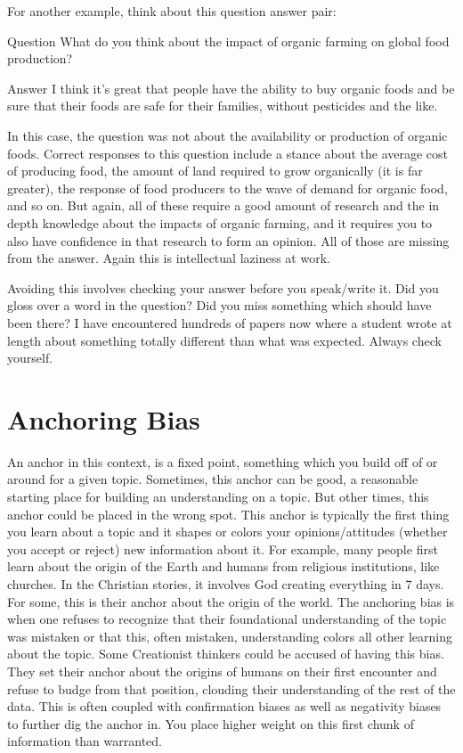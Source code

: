 For another example, think about this question answer pair:
\begin{earg}
\item[Question] What do you think about the impact of organic farming on global food production?
\item[Answer] I think it's great that people have the ability to buy organic foods and be sure that their foods are safe for their families, without pesticides and the like.
\end{earg}
In this case, the question was not about the availability or production of organic foods. Correct responses to this question include a stance about the average cost of producing food, the amount of land required to grow organically (it is far greater), the response of food producers to the wave of demand for organic food, and so on. But again, all of these require a good amount of research and the in depth knowledge about the impacts of organic farming, and it requires you to also have confidence in that research to form an opinion. All of those are missing from the answer. Again this is intellectual laziness at work.

Avoiding this involves checking your answer before you speak/write it. Did you gloss over a word in the question? Did you miss something which should have been there? I have encountered hundreds of papers now where a student wrote at length about something totally different than what was expected. Always check yourself.
\section{Anchoring Bias}

An anchor in this context, is a fixed point, something which you build off of or around for a given topic. Sometimes, this anchor can be good, a reasonable starting place for building an understanding on a topic. But other times, this anchor could be placed in the wrong spot. This anchor is typically the first thing you learn about a topic and it shapes or colors your opinions/attitudes (whether you accept or reject) new information about it. For example, many people first learn about the origin of the Earth and humans from religious institutions, like churches. In the Christian stories, it involves God creating everything in 7 days. For some, this is their anchor about the origin of the world. The anchoring bias is when one refuses to recognize that their foundational understanding of the topic was mistaken or that this, often mistaken, understanding colors all other learning about the topic. Some Creationist thinkers could be accused of having this bias. They set their anchor about the origins of humans on their first encounter and refuse to budge from that position, clouding their understanding of the rest of the data. This is often coupled with confirmation biases as well as negativity biases to further dig the anchor in. You place higher weight on this first chunk of information than warranted.

